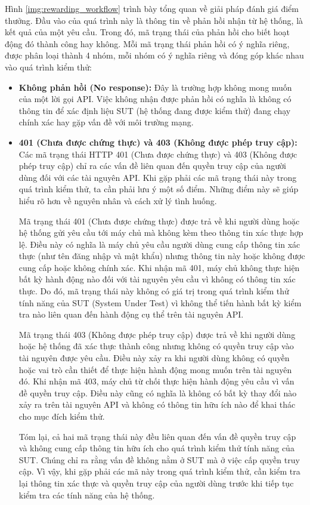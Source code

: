 Hình \ref{img:rewarding_workflow}  trình bày tổng quan về giải pháp đánh giá điểm thưởng. Đầu vào của quá trình này là thông tin về phản hồi nhận từ hệ thống, là kết quả của một yêu cầu. Trong đó, mã trạng thái của phản hồi cho biết hoạt động đó thành công hay không. Mỗi mã trạng thái phản hồi có ý nghĩa riêng, được phân loại thành 4 nhóm, mỗi nhóm có ý nghĩa riêng và đóng góp khác nhau vào quá trình kiểm thử:
\begin{itemize}
    \item \textbf{Không phản hồi (No response):} Đây là trường hợp không mong muốn của một lời gọi API. Việc không nhận được phản hồi có nghĩa là không có thông tin để xác định liệu SUT (hệ thống đang được kiểm thử) đang chạy chính xác hay gặp vấn đề với môi trường mạng.

\item  \textbf{401 (Chưa được chứng thực) và 403 (Không được phép truy cập):} Các mã trạng thái HTTP 401 (Chưa được chứng thực) và 403 (Không được phép truy cập) chỉ ra các vấn đề liên quan đến quyền truy cập của người dùng đối với các tài nguyên API. Khi gặp phải các mã trạng thái này trong quá trình kiểm thử, ta cần phải lưu ý một số điểm. Những điểm này sẽ giúp hiểu rõ hơn về nguyên nhân và cách xử lý tình huống.

Mã trạng thái 401 (Chưa được chứng thực) được trả về khi người dùng hoặc hệ thống gửi yêu cầu tới máy chủ mà không kèm theo thông tin xác thực hợp lệ. Điều này có nghĩa là máy chủ yêu cầu người dùng cung cấp thông tin xác thực (như tên đăng nhập và mật khẩu) nhưng thông tin này hoặc không được cung cấp hoặc không chính xác. Khi nhận mã 401, máy chủ không thực hiện bất kỳ hành động nào đối với tài nguyên yêu cầu vì không có thông tin xác thực. Do đó, mã trạng thái này không có giá trị trong quá trình kiểm thử tính năng của SUT (System Under Test) vì không thể tiến hành bất kỳ kiểm tra nào liên quan đến hành động cụ thể trên tài nguyên API.

Mã trạng thái 403 (Không được phép truy cập) được trả về khi người dùng hoặc hệ thống đã xác thực thành công nhưng không có quyền truy cập vào tài nguyên được yêu cầu. Điều này xảy ra khi người dùng không có quyền hoặc vai trò cần thiết để thực hiện hành động mong muốn trên tài nguyên đó. Khi nhận mã 403, máy chủ từ chối thực hiện hành động yêu cầu vì vấn đề quyền truy cập. Điều này cũng có nghĩa là không có bất kỳ thay đổi nào xảy ra trên tài nguyên API và không có thông tin hữu ích nào để khai thác cho mục đích kiểm thử.

Tóm lại, cả hai mã trạng thái này đều liên quan đến vấn đề quyền truy cập và không cung cấp thông tin hữu ích cho quá trình kiểm thử tính năng của SUT. Chúng chỉ ra rằng vấn đề không nằm ở SUT mà ở việc cấp quyền truy cập. Vì vậy, khi gặp phải các mã này trong quá trình kiểm thử, cần kiểm tra lại thông tin xác thực và quyền truy cập của người dùng trước khi tiếp tục kiểm tra các tính năng của hệ thống.


\end{itemize}
